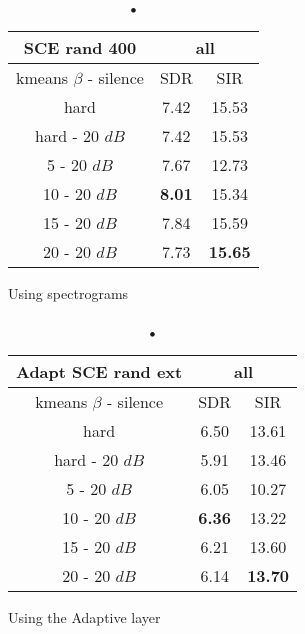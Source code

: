 \documentclass[master,final,11pt]{iscs-thesis}
\begin{document}
\begin{table}
\begin{subtable}{.5\linewidth}
\centering
\begin{tabular}{c|c|c}
SCE rand 400 & \multicolumn{2}{c}{all} \\  
\hline 
kmeans $\beta$ - silence & SDR & SIR  \\ 
\hline
hard  & 7.42 & 15.53  \\ 
\hline
hard - 20 $dB$  & 7.42 & 15.53 \\
\hline
\hline
5 - 20 $dB$  & 7.67 & 12.73 \\ 
\hline
10 - 20 $dB$  & \cellcolor{green}\textbf{8.01} & \cellcolor{green}15.34 \\ 
\hline
15 - 20 $dB$ & 7.84 & 15.59  \\ 
\hline
20 - 20 $dB$ & 7.73 & \textbf{15.65}  \\ 
\end{tabular}
\captionsetup{justification=centering}
\caption{Using spectrograms}
\label{table:SCErand400}
\end{subtable}%
\begin{subtable}{.5\linewidth}
\centering
\begin{tabular}{c|c|c}
Adapt SCE rand ext & \multicolumn{2}{c}{all} \\  
\hline 
kmeans $\beta$ - silence & SDR & SIR  \\ 
\hline
hard  & 6.50 & 13.61  \\ 
hard - 20 $dB$  & 5.91 & 13.46 \\
\hline
\hline
5 - 20 $dB$  & 6.05 & 10.27 \\ 
10 - 20 $dB$  & \cellcolor{green}\textbf{6.36} & \cellcolor{green}13.22 \\ 
15 - 20 $dB$ & 6.21 & 13.60  \\ 
20 - 20 $dB$ & 6.14 & \textbf{13.70}  \\ 
\end{tabular}
\caption{Using the Adaptive layer}
\label{table:AdaptSCErand400}
\end{subtable}
\caption{•}
\end{table}
\end{document}
